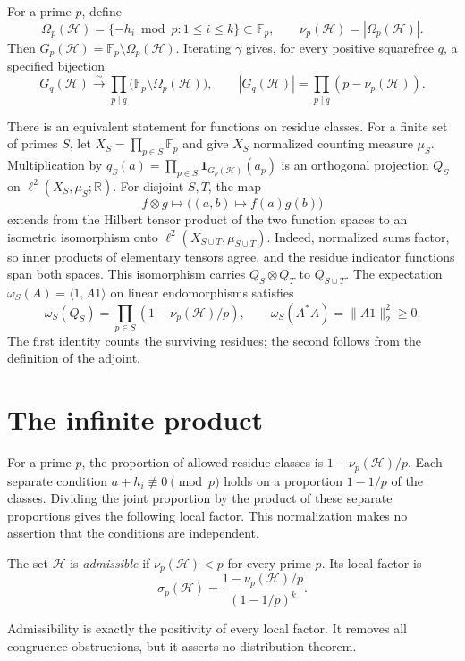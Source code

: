 \documentclass[11pt]{article}
\begin{document}
For a prime $p$, define
\[
 \Omega_p(\mathcal H)=\{-h_i\bmod p:1\leq i\leq k\}\subset\mathbb F_p,
 \qquad \nu_p(\mathcal H)=|\Omega_p(\mathcal H)|.
\]
Then $G_p(\mathcal H)=\mathbb F_p\setminus\Omega_p(\mathcal H)$.  Iterating
$\gamma$ gives, for every positive squarefree $q$, a specified bijection
\[
 G_q(\mathcal H)\xrightarrow{\ \sim\ }
 \prod_{p\mid q}\bigl(\mathbb F_p\setminus\Omega_p(\mathcal H)\bigr),
 \qquad
 |G_q(\mathcal H)|=\prod_{p\mid q}(p-\nu_p(\mathcal H)).
\]

There is an equivalent statement for functions on residue classes.
For a finite set of primes $S$, let
$X_S=\prod_{p\in S}\mathbb F_p$ and give $X_S$ normalized counting
measure $\mu_S$.  Multiplication by
$q_S(a)=\prod_{p\in S}\mathbf1_{G_p(\mathcal H)}(a_p)$ is an
orthogonal projection $Q_S$ on $\ell^2(X_S,\mu_S;\mathbb R)$.
For disjoint $S,T$, the map
\[
 f\otimes g\longmapsto\bigl((a,b)\longmapsto f(a)g(b)\bigr)
\]
extends from the Hilbert tensor product of the two function spaces to
an isometric isomorphism onto $\ell^2(X_{S\cup T},\mu_{S\cup T})$.
Indeed, normalized sums factor, so inner products of elementary tensors
agree, and the residue indicator functions span both spaces.
This isomorphism carries $Q_S\otimes Q_T$ to $Q_{S\cup T}$.
The expectation $\omega_S(A)=\langle1,A1\rangle$ on linear endomorphisms
satisfies
\[
 \omega_S(Q_S)=\prod_{p\in S}(1-\nu_p(\mathcal H)/p),\qquad
 \omega_S(A^*A)=\|A1\|_2^2\geq0.
\]
The first identity counts the surviving residues; the second follows from
the definition of the adjoint.

\section{The infinite product}

For a prime $p$, the proportion of allowed residue classes is
$1-\nu_p(\mathcal H)/p$.  Each separate condition $a+h_i\not\equiv0\pmod p$
holds on a proportion $1-1/p$ of the classes.  Dividing the joint proportion
by the product of these separate proportions gives the following local
factor.  This normalization makes no assertion that the conditions are
independent.

\begin{definition}
The set $\mathcal H$ is \emph{admissible} if
$\nu_p(\mathcal H)<p$ for every prime $p$.  Its local factor is
\[
 \sigma_p(\mathcal H)
 =\frac{1-\nu_p(\mathcal H)/p}{(1-1/p)^k}.
\]
\end{definition}

Admissibility is exactly the positivity of every local factor.  It removes
all congruence obstructions, but it asserts no distribution theorem.
\end{document}
